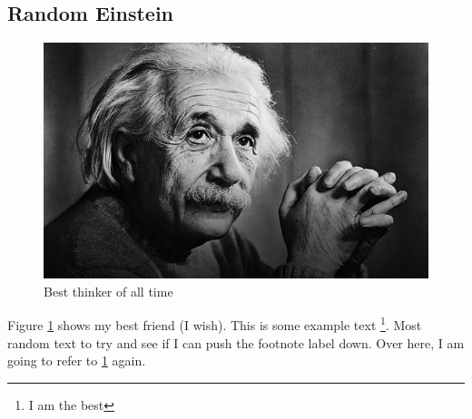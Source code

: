 \documentclass{article}
\begin{document}
        \subsection{Random Einstein}
            \begin{figure}[H]
                \includegraphics[width=\linewidth]{Albert-Einstein.jpg}
                \caption{Best thinker of all time}
                \label{fig:einstein}
            \end{figure}

            Figure \ref{fig:einstein} shows my best friend (I wish). This is some example text \footnote{\label{myfootnote}I am the best}. Most random text to try and see if I can push the footnote label down. Over here, I am going to refer to \ref{myfootnote} again. 
\end{document}
